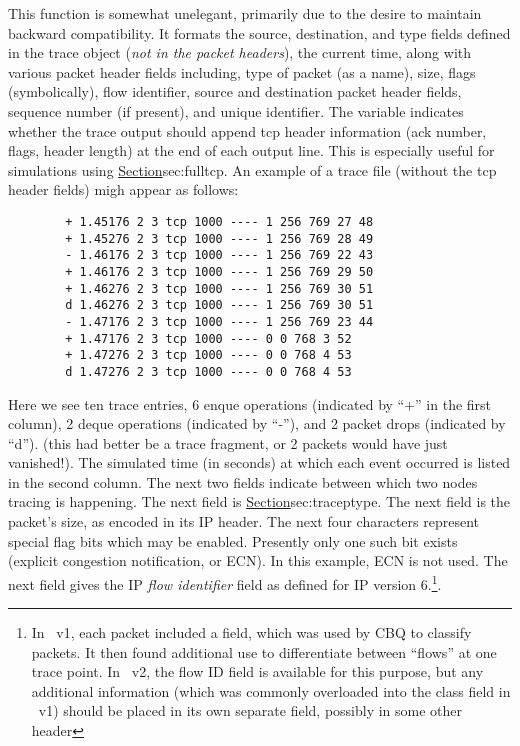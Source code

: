 This function is somewhat unelegant, primarily due to the desire
to maintain backward compatibility.
It formats the source, destination, and type fields defined in the
trace object ({\em not in the packet headers}), the current time,
along with various packet header fields including,
type of packet (as a name), size, flags (symbolically),
flow identifier, source and destination packet header fields,
sequence number (if present), and unique identifier.
The  variable indicates whether the trace
output should append tcp header information (ack number, flags, header length)
at the end of each output line.
This is especially useful for simulations using
\href{FullTCP agents}{Section}{sec:fulltcp}.
An example of a trace file (without the tcp header fields) migh
appear as follows: 
\begin{small}
\begin{verbatim}
        + 1.45176 2 3 tcp 1000 ---- 1 256 769 27 48
        + 1.45276 2 3 tcp 1000 ---- 1 256 769 28 49
        - 1.46176 2 3 tcp 1000 ---- 1 256 769 22 43
        + 1.46176 2 3 tcp 1000 ---- 1 256 769 29 50
        + 1.46276 2 3 tcp 1000 ---- 1 256 769 30 51
        d 1.46276 2 3 tcp 1000 ---- 1 256 769 30 51
        - 1.47176 2 3 tcp 1000 ---- 1 256 769 23 44
        + 1.47176 2 3 tcp 1000 ---- 0 0 768 3 52
        + 1.47276 2 3 tcp 1000 ---- 0 0 768 4 53
        d 1.47276 2 3 tcp 1000 ---- 0 0 768 4 53
\end{verbatim}
\end{small}
Here we see ten trace entries, 6 enque operations (indicated by ``+''
in the first column), 2 deque operations (indicated by ``-''),
and 2 packet drops (indicated by ``d'').
(this had better be a trace fragment, or 2 packets would have just vanished!).
The simulated time (in seconds) at which each event occurred is listed
in the second column.
The next two fields indicate between which two nodes tracing is happening.
The next field is 
\href{a descriptive name for the the type of packet seen}{Section}{sec:traceptype}.
The next field is the packet's size, as encoded in its IP header.
The next four characters represent special flag bits which may be
enabled.  Presently only one such bit exists (explicit congestion
notification, or {\sf ECN}).  In this example, {\sf ECN} is not used.
The next field gives the IP {\em flow identifier} field as defined
for IP version 6.\footnote{In \ns~v1, each packet included a 
field, which was used by CBQ to classify packets.
It then found additional use to differentiate between
``flows'' at one trace point.  In \ns~v2, the flow ID field is available
for this purpose, but any additional information (which was commonly overloaded
into the class field in \ns~v1) should be placed in its own separate field,
possibly in some other header}.
